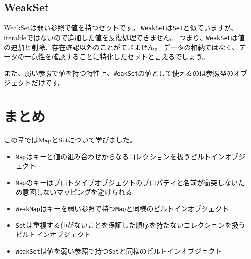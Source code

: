 \hypertarget{weakset}{%
\subsection{WeakSet}\label{weakset}}

\href{https://developer.mozilla.org/ja/docs/Web/JavaScript/Reference/Global_Objects/WeakSet}{WeakSet}は弱い参照で値を持つセットです。
\texttt{WeakSet}は\texttt{Set}と似ていますが、iterableではないので追加した値を反復処理できません。
つまり、\texttt{WeakSet}は値の追加と削除、存在確認以外のことができません。
データの格納ではなく、データの一意性を確認することに特化したセットと言えるでしょう。

また、弱い参照で値を持つ特性上、\texttt{WeakSet}の値として使えるのは参照型のオブジェクトだけです。

\hypertarget{conclusion}{%
\section{まとめ}\label{conclusion}}

この章ではMapとSetについて学びました。

\begin{itemize}
\item
  \texttt{Map}はキーと値の組み合わせからなるコレクションを扱うビルトインオブジェクト
\item
  \texttt{Map}のキーはプロトタイプオブジェクトのプロパティと名前が衝突しないため意図しないマッピングを避けられる
\item
  \texttt{WeakMap}はキーを弱い参照で持つ\texttt{Map}と同様のビルトインオブジェクト
\item
  \texttt{Set}は重複する値がないことを保証した順序を持たないコレクションを扱うビルトインオブジェクト
\item
  \texttt{WeakSet}は値を弱い参照で持つ\texttt{Set}と同様のビルトインオブジェクト
\end{itemize}
